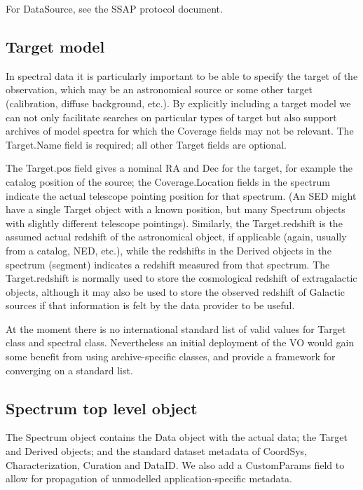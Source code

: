 \documentclass[11pt]{article}
\begin{document}
For DataSource, see the SSAP protocol document.

\subsection{Target model}


In spectral data it is particularly important to be able to
specify the target of the observation, which may be an astronomical
source or some other target (calibration, diffuse background, etc.).
By explicitly including a target model we
can not only facilitate searches on particular types of target
but also support archives of model spectra for which the Coverage
fields may not be relevant.
The Target.Name field is required; all other Target fields are optional. 


The Target.pos field
gives a nominal RA and Dec for the target, for example the catalog
position of the source; the Coverage.Location fields in the
spectrum  indicate the actual telescope pointing position for that
spectrum. (An SED might have a single Target object with a known
position, but many
Spectrum objects with slightly different telescope pointings).
Similarly, the Target.redshift is the assumed actual
redshift of the  astronomical object, if applicable (again,
usually from a catalog, NED, etc.), while the redshifts in the
Derived objects in the spectrum (segment) indicates a redshift measured from
that spectrum. The Target.redshift is normally used to store the
cosmological redshift of extragalactic objects, although it may
also be used to store the observed redshift of Galactic sources if that
information is felt by the data provider to be useful.

At the moment there is no international standard list of
valid values for Target class and spectral class. Nevertheless
an initial deployment of the VO would gain some benefit from
using archive-specific classes, and provide a framework for
converging on a standard list.


\subsection{Spectrum top level object}

The Spectrum object contains the Data object with the actual
data; the Target and Derived objects; and the standard
dataset metadata of CoordSys, Characterization,
Curation and DataID. We also add a CustomParams field
to allow for propagation of unmodelled application-specific metadata.
\end{document}
